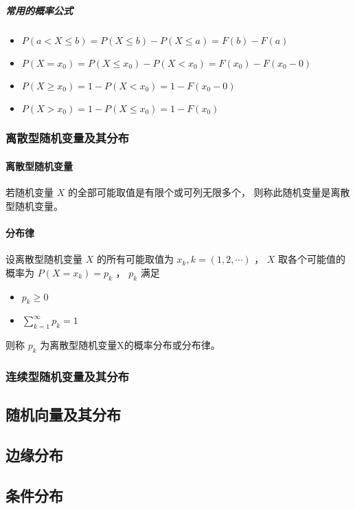 \subparagraph{常用的概率公式}
\begin{itemize}
    \item  $ P(a < X \leqslant b) = P(X \leqslant b) - P(X \leqslant a) = F(b) - F(a) $ 
    \item  $ P(X = x_0) = P(X \leqslant x_0) - P(X < x_0) = F(x_0) - F(x_0 - 0) $ 
    \item  $ P(X \geqslant x_0) = 1 - P(X < x_0) = 1 - F(x_0 - 0) $ 
    \item  $ P(X > x_0) = 1 - P(X \leqslant x_0) = 1 - F(x_0) $ 
\end{itemize}

\subsubsection{离散型随机变量及其分布}

\paragraph{离散型随机变量} 若随机变量 $ X $ 的全部可能取值是有限个或可列无限多个，
则称此随机变量是离散型随机变量。

\paragraph{分布律} 设离散型随机变量 $ X $ 的所有可能取值为 $ x_k,k=(1,2,\cdots) $ ，
 $ X $ 取各个可能值的概率为 $ P(X = x_k) = p_k $ ， $ p_k $ 满足
\begin{itemize}
    \item  $ p_k \geqslant 0 $ 
    \item  $ \sum_{k=1}^\infty p_k = 1 $ 
\end{itemize}
则称 $ p_k $ 为离散型随机变量X的概率分布或分布律。

\subsubsection{连续型随机变量及其分布}

\subsection{随机向量及其分布}

\subsection{边缘分布}

\subsection{条件分布}